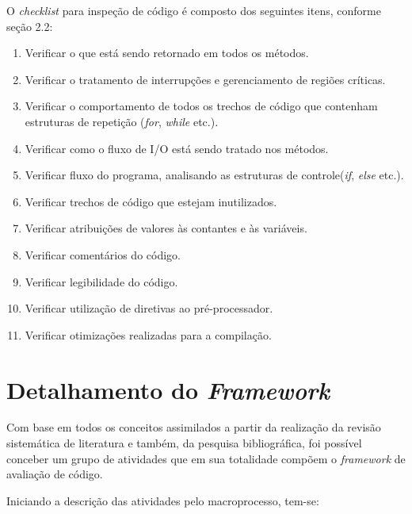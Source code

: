 O \textit{checklist} para inspeção de código é composto dos seguintes itens, conforme seção 2.2:

\begin{enumerate}
	\item Verificar o que está sendo retornado em todos os métodos.
	\item Verificar o tratamento de interrupções e gerenciamento de regiões críticas.
	\item Verificar o comportamento de todos os trechos de código que contenham estruturas de repetição (\textit{for}, \textit{while} etc.).
	\item Verificar como o fluxo de I/O está sendo tratado nos métodos.
	\item Verificar fluxo do programa, analisando as estruturas de controle(\textit{if}, \textit{else} etc.).
	\item Verificar trechos de código que estejam inutilizados.
	\item Verificar atribuições de valores às contantes e às variáveis.
	\item Verificar comentários do código.
	\item Verificar legibilidade do código.
	\item Verificar utilização de diretivas ao pré-processador.
	\item Verificar otimizações realizadas para a compilação.
\end{enumerate}

\section{Detalhamento do \textit{Framework}}

Com base em todos os conceitos assimilados a partir da realização da revisão sistemática de literatura e também, da pesquisa bibliográfica, foi possível conceber um grupo de atividades que em sua totalidade compõem o \textit{framework} de avaliação de código.

Iniciando a descrição das atividades pelo macroprocesso, tem-se:

